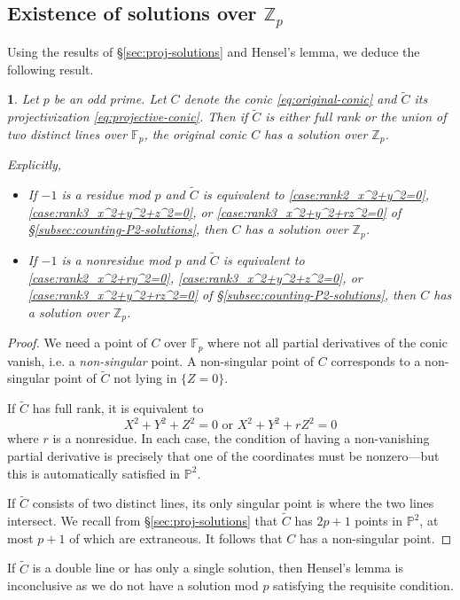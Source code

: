 \documentclass[10pt,a4paper]{amsart}
\numberwithin{equation}{section}
\numberwithin{figure}{section}
\theoremstyle{definition}
\theoremstyle{remark}
\theoremstyle{plain}
\newtheorem{thm}{\protect\theoremname}[section]
\theoremstyle{plain}
\theoremstyle{definition}
\theoremstyle{plain}
\theoremstyle{plain}
\providecommand{\theoremname}{Theorem}
\renewcommand{\P}{\mathbb{P}}
\newcommand{\F}{\mathbb{F}}
\newcommand{\Z}{\mathbb{Z}}
\begin{document}
	\subsection{Existence of solutions over $\Z_p$}
	Using the results of \S\ref{sec:proj-solutions} and Hensel's lemma, we deduce the following result.
	\begin{thm}\label{thm:existence-over-Zp}
		Let $p$ be an odd prime. Let $C$ denote the conic \eqref{eq:original-conic} and $\widetilde{C}$ its projectivization \eqref{eq:projective-conic}. Then if $\widetilde{C}$ is either full rank or the union of two distinct lines over $\F_p$, the original conic $C$ has a solution over $\Z_p$.
		
		Explicitly,
		\begin{itemize}
			\item If $-1$ is a residue mod $p$ and $\widetilde{C}$ is equivalent to \eqref{case:rank2_x^2+y^2=0}, \eqref{case:rank3_x^2+y^2+z^2=0}, or \eqref{case:rank3_x^2+y^2+rz^2=0} of \S\ref{subsec:counting-P2-solutions}, then $C$ has a solution over $\Z_p$.
			\item If $-1$ is a nonresidue mod $p$ and $\widetilde{C}$ is equivalent to \eqref{case:rank2_x^2+ry^2=0}, \eqref{case:rank3_x^2+y^2+z^2=0}, or \eqref{case:rank3_x^2+y^2+rz^2=0} of \S\ref{subsec:counting-P2-solutions}, then $C$ has a solution over $\Z_p$.
		\end{itemize}
	\end{thm}
	\begin{proof}
		We need a point of $C$ over $\F_p$ where not all partial derivatives of the conic vanish, i.e. a \emph{non-singular} point. A non-singular point of $C$ corresponds to a non-singular point of $\widetilde{C}$ not lying in $\{Z=0\}$.
		
		If $\widetilde{C}$ has full rank, it is equivalent to
		\[
		X^2 + Y^2 + Z^2 = 0 \text{ or } X^2 + Y^2 + rZ^2 = 0
		\]
		where $r$ is a nonresidue. In each case, the condition of having a non-vanishing partial derivative is precisely that one of the coordinates must be nonzero---but this is automatically satisfied in $\P^2$.
		
		If $\widetilde{C}$ consists of two distinct lines, its only singular point is where the two lines intersect. We recall from \S\ref{sec:proj-solutions} that $\widetilde{C}$ has $2p+1$ points in $\P^2$, at most $p+1$ of which are extraneous. It follows that $C$ has a non-singular point.
	\end{proof}
	If $\widetilde{C}$ is a double line or has only a single solution, then Hensel's lemma is inconclusive as we do not have a solution mod $p$ satisfying the requisite condition.
\end{document}
